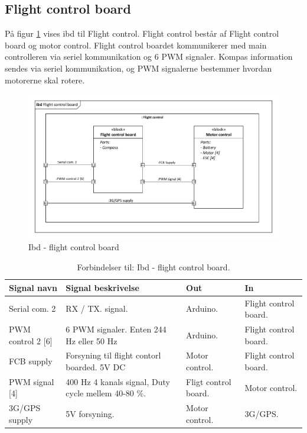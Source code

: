 \subsection{Flight control board}

På figur \ref{fig:ibd_flightcontrolboard} vises ibd til Flight control. Flight control består af Flight control board og motor control. Flight control boardet kommunikerer med main controlleren via seriel kommunikation og 6 PWM signaler. Kompas information sendes via seriel kommunikation, og PWM signalerne bestemmer hvordan motorerne skal rotere. 

\begin{figure}[H]
\centering
\includegraphics[width=1\textwidth]{Billeder/IBD/ibd5_flightcontrolboard.pdf}
\vspace{-1cm}
\caption{Ibd - flight control board}
\label{fig:ibd_flightcontrolboard}
\end{figure}

\vspace{0.5cm}

\begin{table}[H]
	\centering
		\begin{tabular}{|p{3.2 cm}|p{4.6 cm}|p{2.4 cm}|p{2.4 cm}|} 
		\hline
			\textbf{Signal navn} 	& \textbf{Signal beskrivelse}		& \textbf{Out} 				& \textbf{In}     \\ \hline
			Serial com. 2 & RX / TX. signal. & Arduino. & Flight control board.			    \\ \hline
			PWM control 2 [6] & 6 PWM signaler. Enten 244 Hz eller 50 Hz & Arduino. & Flight control board.				\\ \hline
			FCB supply &  Forsyning til flight contorl boarded. 5V DC & Motor control. & Flight control board.	\\ \hline
			PWM signal [4] & 400 Hz 4 kanals signal, Duty cycle mellem 40-80 $\%$. & Fligt control board. & Motor control.   \\ \hline 
			3G/GPS supply & 5V forsyning. & Motor control. & 3G/GPS.  \\ \hline 
		\end{tabular}
	\caption{Forbindelser til: Ibd - flight control board. }
	\label{tab:ibd_Flight_control_board}
\end{table}



